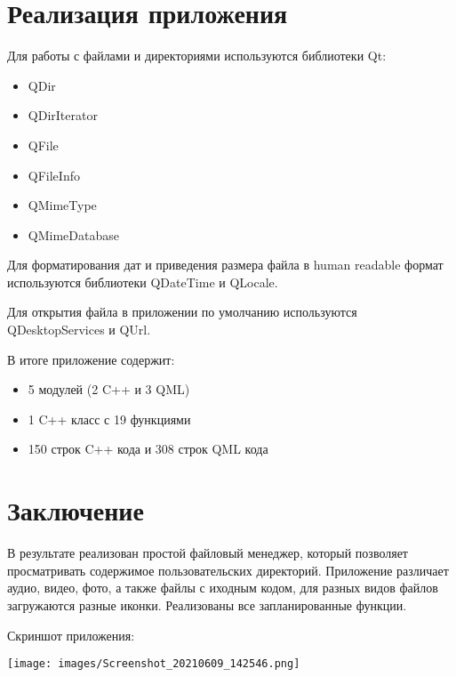 \documentclass[a4paper,12pt]{article}
\begin{document}

\section{Реализация приложения}
Для работы с файлами и директориями используются библиотеки Qt:
\begin{itemize}
    \item QDir
    \item QDirIterator
    \item QFile
    \item QFileInfo
    \item QMimeType
    \item QMimeDatabase
\end{itemize}

Для форматирования дат и приведения размера файла в human readable формат используются библиотеки QDateTime и QLocale.

Для открытия файла в приложении по умолчанию используются QDesktopServices и QUrl.

В итоге приложение содержит:
\begin{itemize}
    \item 5 модулей (2 C++ и 3 QML)
    \item 1 C++ класс с 19 функциями
    \item 150 строк C++ кода и 308 строк QML кода
\end{itemize}


\newpage
\section*{Заключение}
В результате реализован простой файловый менеджер, который позволяет просматривать содержимое пользовательских директорий. Приложение различает аудио, видео, фото, а также файлы с иходным кодом, для разных видов файлов загружаются разные иконки. Реализованы все запланированные функции.

Скриншот приложения:
\begin{center}
    \texttt{[image: images/Screenshot\_20210609\_142546.png]}
\end{center}
\end{document}
